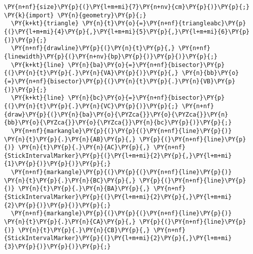 \begin{Verbatim}[commandchars=\\\{\}]
  \PY{n+nf}{size}\PY{p}{(}\PY{l+m+mi}{7}\PY{n+nv}{cm}\PY{p}{)}\PY{p}{;} \PY{k}{import} \PY{n}{geometry}\PY{p}{;}
  \PY{k+kt}{triangle} \PY{n}{t}\PY{o}{=}\PY{n+nf}{triangleabc}\PY{p}{(}\PY{l+m+mi}{4}\PY{p}{,}\PY{l+m+mi}{5}\PY{p}{,}\PY{l+m+mi}{6}\PY{p}{)}\PY{p}{;}
  \PY{n+nf}{drawline}\PY{p}{(}\PY{n}{t}\PY{p}{,} \PY{n+nf}{linewidth}\PY{p}{(}\PY{n+nv}{bp}\PY{p}{)}\PY{p}{)}\PY{p}{;}
  \PY{k+kt}{line} \PY{n}{ba}\PY{o}{=}\PY{n+nf}{bisector}\PY{p}{(}\PY{n}{t}\PY{p}{.}\PY{n}{VA}\PY{p}{)}\PY{p}{,} \PY{n}{bb}\PY{o}{=}\PY{n+nf}{bisector}\PY{p}{(}\PY{n}{t}\PY{p}{.}\PY{n}{VB}\PY{p}{)}\PY{p}{;}
  \PY{k+kt}{line} \PY{n}{bc}\PY{o}{=}\PY{n+nf}{bisector}\PY{p}{(}\PY{n}{t}\PY{p}{.}\PY{n}{VC}\PY{p}{)}\PY{p}{;} \PY{n+nf}{draw}\PY{p}{(}\PY{n}{ba}\PY{o}{\PYZca{}}\PY{o}{\PYZca{}}\PY{n}{bb}\PY{o}{\PYZca{}}\PY{o}{\PYZca{}}\PY{n}{bc}\PY{p}{)}\PY{p}{;}
  \PY{n+nf}{markangle}\PY{p}{(}\PY{p}{(}\PY{n+nf}{line}\PY{p}{)} \PY{n}{t}\PY{p}{.}\PY{n}{AB}\PY{p}{,} \PY{p}{(}\PY{n+nf}{line}\PY{p}{)} \PY{n}{t}\PY{p}{.}\PY{n}{AC}\PY{p}{,} \PY{n+nf}{StickIntervalMarker}\PY{p}{(}\PY{l+m+mi}{2}\PY{p}{,}\PY{l+m+mi}{1}\PY{p}{)}\PY{p}{)}\PY{p}{;}
  \PY{n+nf}{markangle}\PY{p}{(}\PY{p}{(}\PY{n+nf}{line}\PY{p}{)} \PY{n}{t}\PY{p}{.}\PY{n}{BC}\PY{p}{,} \PY{p}{(}\PY{n+nf}{line}\PY{p}{)} \PY{n}{t}\PY{p}{.}\PY{n}{BA}\PY{p}{,} \PY{n+nf}{StickIntervalMarker}\PY{p}{(}\PY{l+m+mi}{2}\PY{p}{,}\PY{l+m+mi}{2}\PY{p}{)}\PY{p}{)}\PY{p}{;}
  \PY{n+nf}{markangle}\PY{p}{(}\PY{p}{(}\PY{n+nf}{line}\PY{p}{)} \PY{n}{t}\PY{p}{.}\PY{n}{CA}\PY{p}{,} \PY{p}{(}\PY{n+nf}{line}\PY{p}{)} \PY{n}{t}\PY{p}{.}\PY{n}{CB}\PY{p}{,} \PY{n+nf}{StickIntervalMarker}\PY{p}{(}\PY{l+m+mi}{2}\PY{p}{,}\PY{l+m+mi}{3}\PY{p}{)}\PY{p}{)}\PY{p}{;}
\end{Verbatim}

